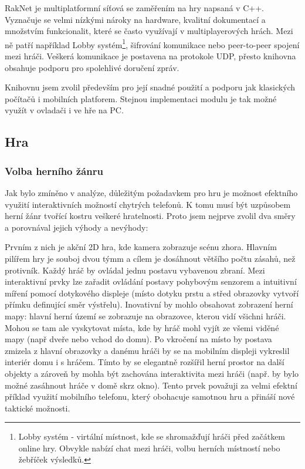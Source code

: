 \documentclass[thesis=B,czech,hidelinks]{FITthesis}[2012/06/26] %
\begin{document}
RakNet je multiplatformní síťová se zaměřením na hry napsaná v C++. Vyznačuje se velmi nízkými nároky na hardware, kvalitní dokumentací a množstvím funkcionalit, které se často využívají v multiplayerových hrách. \cite{raknet} Mezi ně patří například Lobby systém\footnote{Lobby systém - virtální místnost, kde se shromažďují hráči před začátkem online hry. Obvykle nabízí chat mezi hráči, volbu herních místností nebo žebříček výsledků.}, šifrování komunikace nebo peer-to-peer spojení mezi hráči. Veškerá komunikace je postavena na protokole UDP, přesto knihovna obsahuje podporu pro spolehlivé doručení zpráv.

Knihovnu jsem zvolil především pro její snadné použití a podporu jak klasických počítačů i mobilních platforem. Stejnou implementaci modulu je tak možné využít v ovladači i ve hře na PC.

\subsection{Hra}


\subsubsection{Volba herního žánru}

Jak bylo zmíněno v analýze, důležitým požadavkem pro hru je možnost efektního využití interaktivních možností chytrých telefonů. K tomu musí být uzpůsobem herní žánr tvořící kostru veškeré hratelnosti. Proto jsem nejprve zvolil dva směry a porovnával jejich výhody a nevýhody:

Prvním z nich je akční 2D hra, kde kamera zobrazuje scénu zhora. Hlavním pilířem hry je souboj dvou týmm a cílem je dosáhnout většího počtu zásahů, než protivník. Každý hráč by ovládal jednu postavu vybavenou zbraní. Mezi interaktivní prvky lze zařadit ovládání postavy pohybovým senzorem a intuitivní míření pomocí dotykového displeje (místo dotyku prstu a střed obrazovky vytvoří přímku definující směr výstřelu). Inovativní by mohlo obsahovat zobrazení herní mapy: hlavní herní území se zobrazuje na obrazovce, kterou vidí všichni hráči. Mohou se tam ale vyskytovat místa, kde by hráč mohl vyjít ze všemi viděné mapy (např dveře nebo vchod do domu). Po vkročení na místo by postava zmizela z hlavní obrazovky a danému hráči by se na mobilním displeji vykreslil interiér domu i s hráčem. Tímto by se elegantně rozšířil herní prostor na další objekty a zároveň by mohla být zachována interaktivita mezi hráči (např. by bylo možné zasáhnout hráče v domě skrz okno). Tento prvek považuji za velmi efektní příklad využití mobilního telefonu, který obohacuje samotnou hru a přináší nové taktické možnosti.
\end{document}
